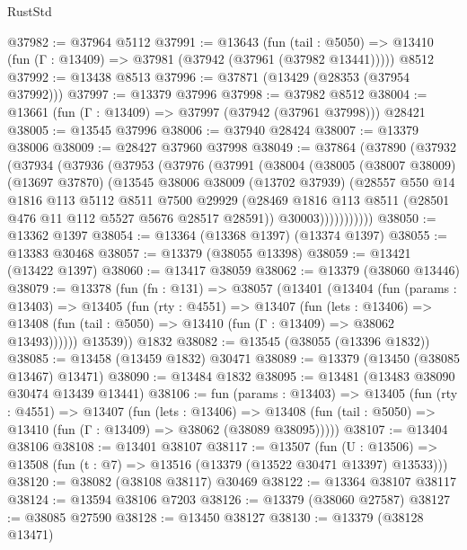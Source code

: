 \begin{lexlean}{RustStd}
\begin{coremodule}
@37982 := @37964 @5112
@37991 := @13643
    (fun (tail : @5050) => @13410 (fun (Γ : @13409) => @37981 (@37942 (@37961 (@37982 @13441)))))
    @8512
@37992 := @13438 @8513
@37996 := @37871 (@13429 (@28353 (@37954 @37992)))
@37997 := @13379 @37996
@37998 := @37982 @8512
@38004 := @13661 (fun (Γ : @13409) => @37997 (@37942 (@37961 @37998))) @28421
@38005 := @13545 @37996
@38006 := @37940 @28424
@38007 := @13379 @38006
@38009 := @28427 @37960 @37998
@38049 := @37864
    (@37890
      (@37932
        (@37934
          (@37936
            (@37953
              (@37976
                (@37991
                  (@38004
                    (@38005
                      (@38007 @38009)
                      (@13697 @37870)
                      (@13545
                        @38006
                        @38009
                        (@13702 @37939)
                        (@28557
                          @550
                          @14
                          @1816
                          @113
                          @5112
                          @8511
                          @7500
                          @29929
                          (@28469 @1816 @113 @8511 (@28501 @476 @11 @112 @5527 @5676 @28517 @28591))
                          @30003)))))))))))
@38050 := @13362 @1397
@38054 := @13364 (@13368 @1397) (@13374 @1397)
@38055 := @13383 @30468
@38057 := @13379 (@38055 @13398)
@38059 := @13421 (@13422 @1397)
@38060 := @13417 @38059
@38062 := @13379 (@38060 @13446)
@38079 := @13378
    (fun (fn : @131) =>
    @38057
      (@13401
        (@13404
          (fun (params : @13403) =>
          @13405
            (fun (rty : @4551) =>
            @13407
              (fun (lets : @13406) =>
              @13408 (fun (tail : @5050) => @13410 (fun (Γ : @13409) => @38062 @13493))))))
        @13539))
    @1832
@38082 := @13545 (@38055 (@13396 @1832))
@38085 := @13458 (@13459 @1832) @30471
@38089 := @13379 (@13450 (@38085 @13467) @13471)
@38090 := @13484 @1832
@38095 := @13481 (@13483 @38090 @30474 @13439 @13441)
@38106 := fun (params : @13403) =>
  @13405
    (fun (rty : @4551) =>
    @13407
      (fun (lets : @13406) =>
      @13408 (fun (tail : @5050) => @13410 (fun (Γ : @13409) => @38062 (@38089 @38095)))))
@38107 := @13404 @38106
@38108 := @13401 @38107
@38117 := @13507
    (fun (U : @13506) => @13508 (fun (t : @7) => @13516 (@13379 (@13522 @30471 @13397) @13533)))
@38120 := @38082 (@38108 @38117) @30469
@38122 := @13364 @38107 @38117
@38124 := @13594 @38106 @7203
@38126 := @13379 (@38060 @27587)
@38127 := @38085 @27590
@38128 := @13450 @38127
@38130 := @13379 (@38128 @13471)

\end{coremodule}
\end{lexlean}
